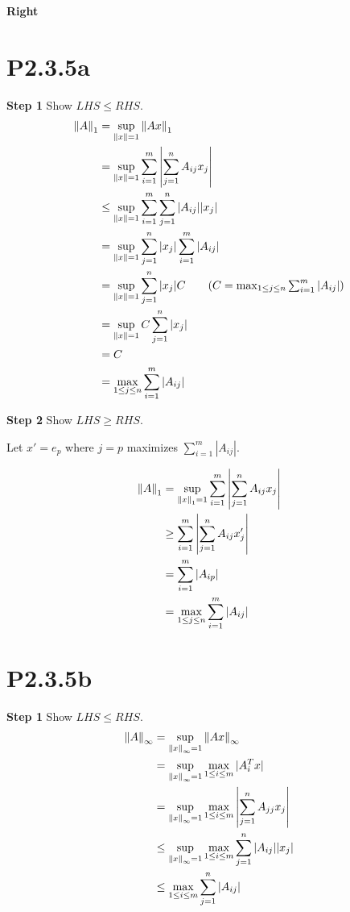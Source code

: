 \documentclass{article}
\begin{document}
\textbf{Right}
\section*{P2.3.5a}
\textbf{Step 1} Show $LHS \le RHS$.
\begin{align*}
    \norm{A}_1
     & = \sup_{\norm{x}=1} \norm{Ax}_1                                        \\
     & = \sup_{\norm{x}=1}
    \sum_{i=1}^m\left|\sum_{j=1}^n A_{ij}x_j\right|                           \\
     & \le \sup_{\norm{x}=1}
    \sum_{i=1}^m\sum_{j=1}^n |A_{ij}||x_j|                                    \\
     & = \sup_{\norm{x}=1}
    \sum_{j=1}^n |x_j|\sum_{i=1}^m|A_{ij}|                                    \\
     & = \sup_{\norm{x}=1}
    \sum_{j=1}^n |x_j|C \tag*{($C=\max_{1\le j\le n} \sum_{i=1}^m |A_{ij}|$)} \\
     & = \sup_{\norm{x}=1} C  \sum_{j=1}^n |x_j|                              \\
     & = C                                                                    \\
     & = \max_{1\le j\le n} \sum_{i=1}^m |A_{ij}|
\end{align*}

\textbf{Step 2} Show $LHS\ge RHS$.

Let $x'=e_p$ where $j=p$ maximizes $\sum_{i=1}^m |A_{ij}|$.

\begin{align*}
    \norm{A}_1
     & = \sup_{\norm{x}_1=1}
    \sum_{i=1}^m\left|\sum_{j=1}^n A_{ij}x_j\right|           \\
     & \ge  \sum_{i=1}^m\left|\sum_{j=1}^n A_{ij}x'_j\right|  \\
     & = \sum_{i=1}^m\left|A_{ip}\right|                      \\
     & = \max_{1 \le j \le n} \sum_{i=1}^m\left|A_{ij}\right|
\end{align*}

\section*{P2.3.5b}
\textbf{Step 1} Show $LHS \le RHS$.
\begin{align*}
    \norm{A}_\infty
     & = \sup_{\norm{x}_\infty=1}
    \norm{Ax}_\infty                                   \\
     & = \sup_{\norm{x}_\infty=1}
    \max_{1 \le i \le m} |A_i^Tx|                      \\
     & = \sup_{\norm{x}_\infty=1}
    \max_{1 \le i \le m}
    \left|\sum_{j=1}^nA_{jj}x_j\right|                 \\
     & \le \sup_{\norm{x}_\infty=1}
    \max_{1 \le i \le m}
    \sum_{j=1}^n |A_{ij}||x_j|                         \\
     & \le \max_{1 \le i \le m}  \sum_{j=1}^n |A_{ij}|
\end{align*}
\end{document}
